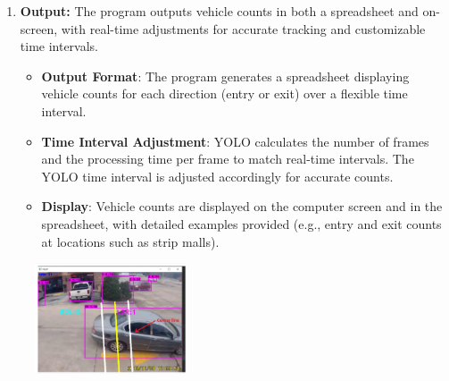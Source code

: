 {\begin{enumerate}
\begin{itemize}
    \item \textbf{Counting Directions}: The direction of vehicle movement is determined by whether the center point of the bounding box (BB) crosses the reference line:
    \begin{itemize}
        \item \textbf{Entry Count (L2R)}: Vehicles crossing from left to right (L2R) are counted as entering.
        \item \textbf{Exit Count (R2L)}: Vehicles crossing from right to left (R2L) are counted as exiting.
    \end{itemize}
    \item \textbf{Functions for Counting}:
    \begin{itemize}
        \item \texttt{leftToRight\_counter}: Tracks and counts vehicles entering from the left.
        \item \texttt{rightToLeft\_counter}: Tracks and counts vehicles exiting from the right.
    \end{itemize}
\end{itemize}
\item \textbf{Output:} The program outputs vehicle counts in both a spreadsheet and on-screen, with real-time adjustments for accurate tracking and customizable time intervals.
\begin{itemize}
    \item \textbf{Output Format}: The program generates a spreadsheet displaying vehicle counts for each direction (entry or exit) over a flexible time interval.
    \item \textbf{Time Interval Adjustment}: YOLO calculates the number of frames and the processing time per frame to match real-time intervals. The YOLO time interval is adjusted accordingly for accurate counts.
    \item \textbf{Display}: Vehicle counts are displayed on the computer screen and in the spreadsheet, with detailed examples provided (e.g., entry and exit counts at locations such as strip malls).
\end{itemize}
\end{enumerate}
%
%
\begin{figure}[h!]
    \centering
    \includegraphics[width=0.4\textwidth]{images/Paper 3 Algorithm Implementation.png}

\end{figure}}
